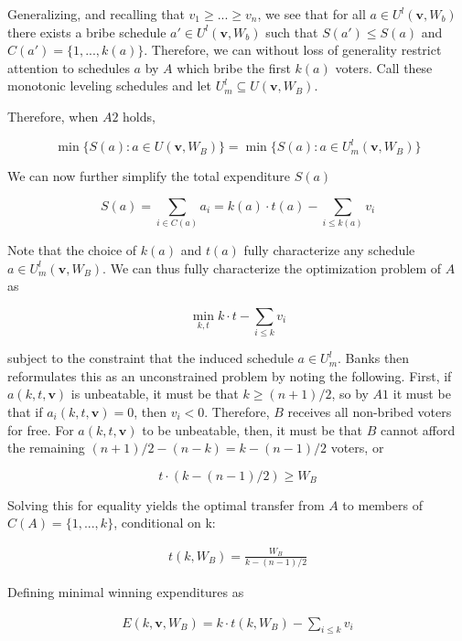 \documentclass[12pt,a4paper]{article}
\begin{document}
Generalizing, and recalling that $v_1 \geq ... \geq v_n$, we see that for all $a \in U^l(\mathbf{v}, W_b)$ there exists a bribe schedule $a' \in U^l(\mathbf{v}, W_b)$ such that $S(a') \leq S(a)$ and $C(a') = \{1, ..., k(a)\}$. Therefore, we can without loss of generality restrict attention to schedules $a$ by $A$ which bribe the first $k(a)$ voters. Call these monotonic leveling schedules and let $U_m^l \subseteq U(\mathbf{v}, W_B)$.

Therefore, when $A2$ holds,

$$\min\{S(a): a \in U(\mathbf{v}, W_B)\} = \min\{S(a): a \in U^l_m(\mathbf{v}, W_B)\}$$

We can now further simplify the total expenditure $S(a)$

\begin{equation*}
    S(a) = \sum_{i \in C(a)}a_i = k(a) \cdot t(a) - \sum_{i \leq k(a)}v_i
\end{equation*}

Note that the choice of $k(a)$ and $t(a)$ fully characterize any schedule $a \in U_m^l(\mathbf{v}, W_B)$. We can thus fully characterize the optimization problem of $A$ as

\begin{equation*}
    \min_{k,t} k \cdot t- \sum_{i \leq k} v_i
\end{equation*}

subject to the constraint that the induced schedule $a \in U_m^l$. Banks then reformulates this as an unconstrained problem by noting the following. First, if $a(k, t, \mathbf{v})$ is unbeatable, it must be that $k \geq (n + 1)/2$, so by $A1$ it must be that if $a_i(k, t, \mathbf{v}) = 0$, then $v_i < 0$. Therefore, $B$ receives all non-bribed voters for free. For $a(k, t, \mathbf{v})$ to be unbeatable, then, it must be that $B$ cannot afford the remaining $(n + 1)/2 - (n - k) = k - (n - 1)/2$ voters, or

$$t \cdot (k - (n - 1)/2) \geq W_B$$

Solving this for equality yields the optimal transfer from $A$ to members of $C(A) = \{1, ..., k\}$, conditional on k:

\begin{align}
    \label{eqn:common_transfer}
    t(k, W_B) = \frac{W_B}{k - (n - 1)/2}
\end{align}

Defining minimal winning expenditures as

\begin{align}
    \label{eqn:total_expenditure}
    E(k, \mathbf{v}, W_B) = k \cdot t(k, W_B) - \sum_{i \leq k} v_i
\end{align}
\end{document}
